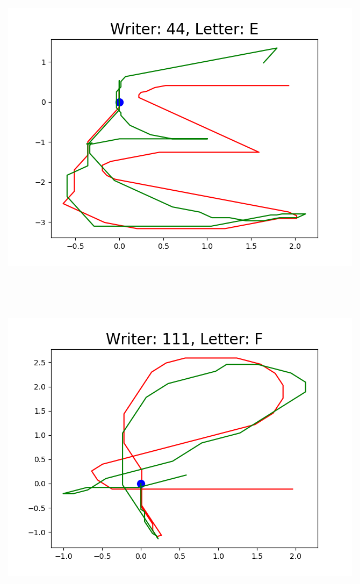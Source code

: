 \begin{figure}
\begin{subfigure}[b]{0.17\textwidth}
          \includegraphics[width=\textwidth]{images/framework/comparison_figures/E_44.png}
      \end{subfigure}
      ~
      \begin{subfigure}[b]{0.17\textwidth}
          \includegraphics[width=\textwidth]{images/framework/comparison_figures/F_111.png}
      \end{subfigure}
      ~
      \begin{subfigure}[b]{0.17\textwidth}

\end{subfigure}
\end{figure}
